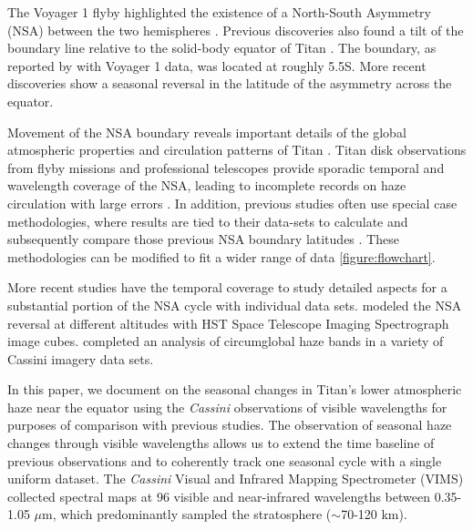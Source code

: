 \documentclass[apj,tighten]{emulateapj}
\begin{document}
The Voyager 1 flyby highlighted the existence of a North-South Asymmetry (NSA) between the two hemispheres \citep{smith1981encounter}.
Previous discoveries also found a tilt of the boundary line relative to the solid-body equator of Titan \citep{Roman2009}.
The boundary, as reported by \citep{Sromovsky1981} with Voyager 1 data, was located at roughly 5.5\degree{}S.
More recent discoveries show a seasonal reversal in the latitude of the asymmetry across the equator. 


Movement of the NSA boundary reveals important details of the global atmospheric properties and circulation patterns of Titan \citep{hirtzig2006monitoring}.
Titan disk observations from flyby missions and professional telescopes provide sporadic temporal and wavelength coverage of the NSA, leading to incomplete records on haze circulation with large errors \citep{lorenz2001titan,lorenz2004seasonal}.
In addition, previous studies often use special case methodologies, where results are tied to their data-sets to calculate and subsequently compare those previous NSA boundary latitudes \citep{Roman2009}.
These methodologies can be modified to fit a wider range of data \autoref{figure:flowchart}.


More recent studies have the temporal coverage to study detailed aspects for a substantial portion of the NSA cycle with individual data sets.
\cite{karkoschka2022titan} modeled the NSA reversal at different altitudes with HST Space Telescope Imaging Spectrograph image cubes.
\cite{kutsop2022titan} completed an analysis of circumglobal haze bands in a variety of Cassini imagery data sets. 


In this paper, we document on the seasonal changes in Titan's lower atmospheric haze near the equator using the \textit{Cassini} observations of visible wavelengths for purposes of comparison with previous studies.
The observation of seasonal haze changes through visible wavelengths allows us to extend the time baseline of previous observations and to coherently track one seasonal cycle with a single uniform dataset.
The \textit{Cassini} Visual and Infrared Mapping Spectrometer (VIMS) collected spectral maps at 96 visible and near-infrared wavelengths between 0.35-1.05 $\mu$m, which predominantly sampled the stratosphere ($\sim$70-120 km).
\end{document}
